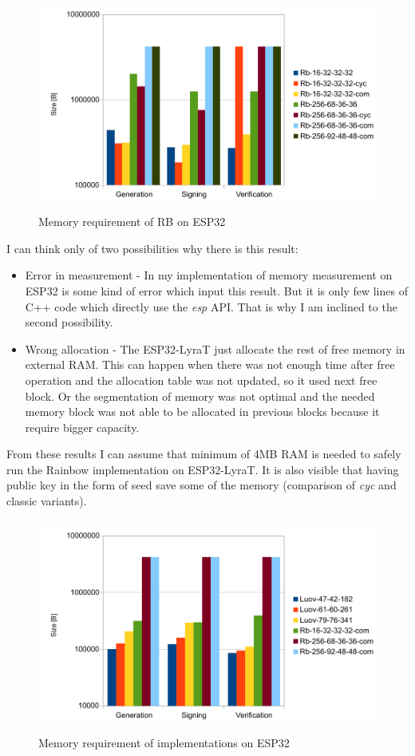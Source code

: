 \documentclass[thesis=M,english]{FITthesis}[2019/12/23]
\begin{document}
\begin{figure}[H]
\centering
\includegraphics[width=13cm,height=7cm]{images/mem-rb.pdf}
\caption{Memory requirement of RB on ESP32}
\label{mem-rb}
\end{figure}

\noindent
I can think only of two possibilities why there is this result:
\begin{itemize}
\item	Error in measurement - In my implementation of memory measurement on ESP32 is some kind of error which input this result. But it is only few lines of C++ code which directly use the \textit{esp} API. That is why I am inclined to the second possibility.
\item	Wrong allocation - The ESP32-LyraT just allocate the rest of free memory in external RAM. This can happen when there was not enough time after free operation and the allocation table was not updated, so it used next free block. Or the segmentation of memory was not optimal and the needed memory block was not able to be allocated in previous blocks because it require bigger capacity.
\end{itemize}

\bigskip
\noindent
From these results I can assume that minimum of 4MB RAM is needed to safely run the Rainbow implementation on ESP32-LyraT. It is also visible that having public key in the form of seed save some of the memory (comparison of \textit{cyc} and classic variants).

\begin{figure}[H]
\centering
\includegraphics[width=13cm,height=7cm]{images/mem-both.pdf}
\caption{Memory requirement of implementations on ESP32}
\label{mem-both}
\end{figure}
\end{document}
